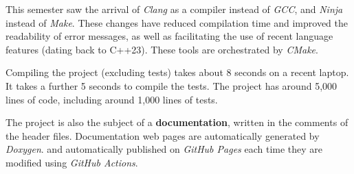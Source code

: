 This semester saw the arrival of \textit{Clang} as a compiler instead of \textit{GCC}, and \textit{Ninja} instead of \textit{Make}. \cite{Clang} \cite{Ninja}
These changes have reduced compilation time and improved the readability of error messages, as well as facilitating the use of recent language features (dating back to C++23).
These tools are orchestrated by \textit{CMake}. \cite{CMake}

Compiling the project (excluding tests) takes about 8 seconds on a recent laptop. It takes a further 5 seconds to compile the tests. The project has around 5,000 lines of code, including around 1,000 lines of tests.

The project is also the subject of a \textbf{documentation}, written in the comments of the header files. Documentation web pages are automatically generated by \textit{Doxygen}. \cite{Doxygen} and automatically published on \textit{GitHub Pages} each time they are modified using \textit{GitHub Actions}. \cite{Leroy_doc}